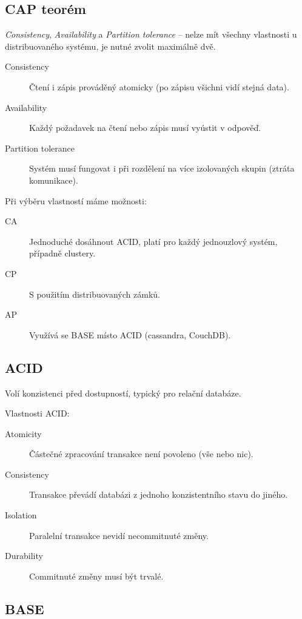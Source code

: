 \subsection*{CAP teorém}

\textit{Consistency}, \textit{Availability} a \textit{Partition tolerance} -- nelze mít všechny vlastnosti u distribuovaného systému, je nutné zvolit maximálně dvě.

\begin{description}
    \item[Consistency] Čtení i zápis prováděný atomicky (po zápisu všichni vidí stejná data).
    \item[Availability] Každý požadavek na čtení nebo zápis musí vyústit v odpověď.
    \item[Partition tolerance] Systém musí fungovat i při rozdělení na více izolovaných skupin (ztráta komunikace). 
\end{description}

Při výběru vlastností máme možnosti:

\begin{description}
    \item[CA] Jednoduché dosáhnout ACID, platí pro každý jednouzlový systém, případně clustery.
    \item[CP] S použitím distribuovaných zámků.
    \item[AP] Využívá se BASE místo ACID (cassandra, CouchDB). 
\end{description}

\subsection*{ACID}

Volí konzistenci před dostupností, typický pro relační databáze.

Vlastnosti ACID:

\begin{description}
    \item[Atomicity] Částečné zpracování transakce není povoleno (vše nebo nic).
    \item[Consistency] Transakce převádí databázi z jednoho konzistentního stavu do jiného.
    \item[Isolation] Paralelní transakce nevidí necommitnuté změny.
    \item[Durability] Commitnuté změny musí být trvalé. 
\end{description}

\subsection*{BASE}

